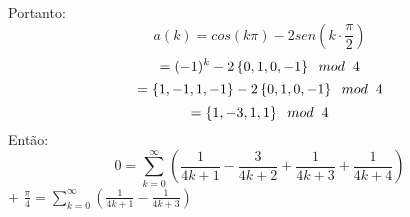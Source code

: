 \documentclass[12pt]{article}
\begin{document}
Portanto:
\[a(k)=cos(k\pi)-2sen(k\cdot\frac{\pi}{2})\]
\[=(-1)^k-2\left\{0,1,0,-1\right\}\hspace{0.2cm}mod\hspace{0.2cm}4\]
\[=\left\{1,-1,1,-1\right\}-2\left\{0,1,0,-1\right\}\hspace{0.2cm}mod\hspace{0.2cm}4\]
\[=\left\{1,-3,1,1\right\}\hspace{0.2cm}mod\hspace{0.2cm}4\]
Então:
\[0=\sum_{k=0}^{\infty}\left(\frac{1}{4k+1}-\frac{3}{4k+2}+\frac{1}{4k+3}+\frac{1}{4k+4}\right)\]
\hspace{1.8cm} \(+\)
\hspace{0.2cm}\Large{\(\frac{\pi}{4}=\sum_{k=0}^{\infty}\left(\frac{1}{4k+1}-\frac{1}{4k+3}\right)\)}
\begin{center}
    


\end{center}
\end{document}
